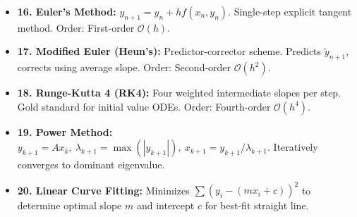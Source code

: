 \documentclass[10pt,a4paper]{report}
\begin{document}
\begin{tcolorbox}[colback=codebg,colframe=secondary,title=\textbf{Unit 5 \& 6: Differential Equations, Eigenvalues \& Curve Fitting},boxrule=1.2pt,arc=2mm]
\begin{itemize}[leftmargin=*,itemsep=4pt]
\item \textbf{16. Euler's Method:} $y_{n+1} = y_n + h f(x_n, y_n)$. Single-step explicit tangent method. Order: First-order $\mathcal{O}(h)$.
\item \textbf{17. Modified Euler (Heun's):} Predictor-corrector scheme. Predicts $\tilde{y}_{n+1}$, corrects using average slope. Order: Second-order $\mathcal{O}(h^2)$.
\item \textbf{18. Runge-Kutta 4 (RK4):} Four weighted intermediate slopes per step. Gold standard for initial value ODEs. Order: Fourth-order $\mathcal{O}(h^4)$.
\item \textbf{19. Power Method:} $y_{k+1} = A x_k, \ \lambda_{k+1} = \max(|y_{k+1}|), \ x_{k+1} = y_{k+1} / \lambda_{k+1}$. Iteratively converges to dominant eigenvalue.
\item \textbf{20. Linear Curve Fitting:} Minimizes $\sum (y_i - (m x_i + c))^2$ to determine optimal slope $m$ and intercept $c$ for best-fit straight line.
\end{itemize}
\end{tcolorbox}
\end{document}
